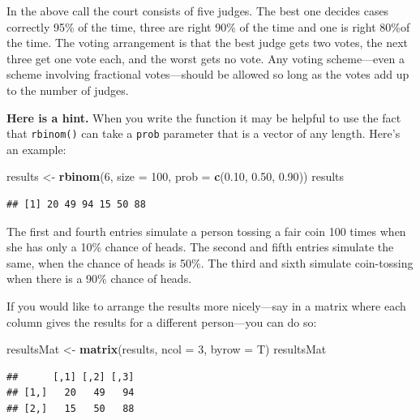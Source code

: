 \documentclass[]{book}
\makeatletter
\newenvironment{Shaded}{\begin{snugshade}}{\end{snugshade}}
\newcommand{\KeywordTok}[1]{\textcolor[rgb]{0.13,0.29,0.53}{\textbf{{#1}}}}
\newcommand{\DataTypeTok}[1]{\textcolor[rgb]{0.13,0.29,0.53}{{#1}}}
\newcommand{\DecValTok}[1]{\textcolor[rgb]{0.00,0.00,0.81}{{#1}}}
\newcommand{\FloatTok}[1]{\textcolor[rgb]{0.00,0.00,0.81}{{#1}}}
\newcommand{\StringTok}[1]{\textcolor[rgb]{0.31,0.60,0.02}{{#1}}}
\newcommand{\NormalTok}[1]{{#1}}
\newenvironment{kframe}{%
\medskip{}
\setlength{\fboxsep}{.8em}
 \def\at@end@of@kframe{}%
 \ifinner\ifhmode%
  \def\at@end@of@kframe{\end{minipage}}%
  \begin{minipage}{\columnwidth}%
 \fi\fi%
 \def\FrameCommand##1{\hskip\@totalleftmargin \hskip-\fboxsep
 \colorbox{shadecolor}{##1}\hskip-\fboxsep
     \hskip-\linewidth \hskip-\@totalleftmargin \hskip\columnwidth}%
 \MakeFramed {\advance\hsize-\width
   \@totalleftmargin\z@ \linewidth\hsize
   \@setminipage}}%
 {\par\unskip\endMakeFramed%
 \at@end@of@kframe}
\renewenvironment{Shaded}{\begin{kframe}}{\end{kframe}}
\theoremstyle{definition}
\theoremstyle{definition}
\theoremstyle{remark}
\makeatother
\begin{document}
{\begin{enumerate}
  In the above call the court consists of five judges. The best one
  decides cases correctly 95\% of the time, three are right 90\% of the
  time and one is right 80\%of the time. The voting arrangement is that
  the best judge gets two votes, the next three get one vote each, and
  the worst gets no vote. Any voting scheme---even a scheme involving
  fractional votes---should be allowed so long as the votes add up to
  the number of judges.

  \textbf{Here is a hint.} When you write the function it may be helpful
  to use the fact that \texttt{rbinom()} can take a \texttt{prob}
  parameter that is a vector of any length. Here's an example:

\begin{Shaded}
\begin{Highlighting}[]
\NormalTok{results <-}\StringTok{ }\KeywordTok{rbinom}\NormalTok{(}\DecValTok{6}\NormalTok{, }\DataTypeTok{size =} \DecValTok{100}\NormalTok{, }\DataTypeTok{prob =} \KeywordTok{c}\NormalTok{(}\FloatTok{0.10}\NormalTok{, }\FloatTok{0.50}\NormalTok{, }\FloatTok{0.90}\NormalTok{))}
\NormalTok{results}
\end{Highlighting}
\end{Shaded}

\begin{verbatim}
## [1] 20 49 94 15 50 88
\end{verbatim}

  The first and fourth entries simulate a person tossing a fair coin 100
  times when she has only a 10\% chance of heads. The second and fifth
  entries simulate the same, when the chance of heads is 50\%. The third
  and sixth simulate coin-tossing when there is a 90\% chance of heads.

  If you would like to arrange the results more nicely---say in a matrix
  where each column gives the results for a different person---you can
  do so:

\begin{Shaded}
\begin{Highlighting}[]
\NormalTok{resultsMat <-}\StringTok{ }\KeywordTok{matrix}\NormalTok{(results, }\DataTypeTok{ncol =} \DecValTok{3}\NormalTok{, }\DataTypeTok{byrow =} \NormalTok{T)}
\NormalTok{resultsMat}
\end{Highlighting}
\end{Shaded}

\begin{verbatim}
##      [,1] [,2] [,3]
## [1,]   20   49   94
## [2,]   15   50   88
\end{verbatim}


\end{enumerate}}
\end{document}

